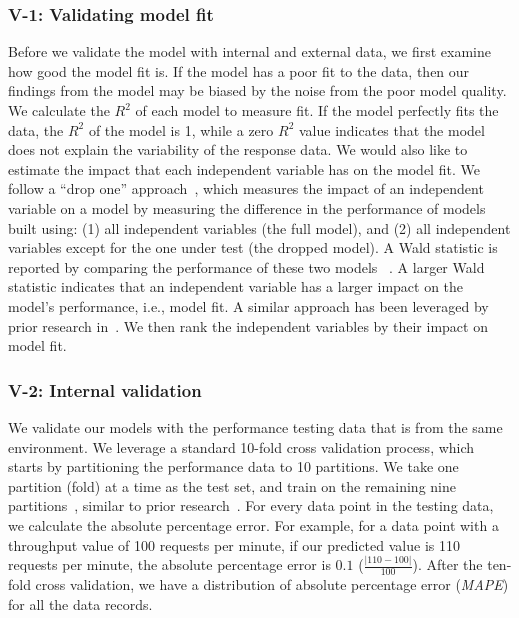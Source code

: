\documentclass[smallextended]{svjour3}       %
\begin{document}
\subsubsection{V-1: Validating model fit}

Before we validate the model with internal and external data, we first examine how good the model fit is. If the model has a poor fit to the data, then our findings from the model may be biased by the noise from the poor model quality. We calculate the $R^2$ of each model to measure fit. If the model perfectly fits the data, the $R^2$ of the model is 1, while a zero $R^2$ value indicates that the model does not explain the variability of the response data. We would also like to estimate the impact that each independent variable has on the model fit. We follow a ``drop one'' approach~\cite{Chambers1990}, which measures the impact of an independent variable on a model by measuring the difference in the performance of models built using: (1) all independent variables (the full model), and (2) all independent variables except for the one under test (the dropped model). A Wald statistic is reported by comparing the performance of these two models ~\cite{harrell2001regression}. A larger Wald statistic indicates that an independent variable has a larger impact on the model's performance, i.e., model fit. A similar approach has been leveraged by prior research in~\cite{mcintosh2015emse}. We then rank the independent variables by their impact on model fit. 


\subsubsection{V-2: Internal validation}

We validate our models with the performance testing data that is from the same environment. We leverage a standard 10-fold cross validation process, which starts by partitioning the performance data to 10 partitions. We take one partition (fold) at a time as the test set, and train on the remaining nine partitions~\cite{10foldcross,kohavi1995study}, similar to prior research~\cite{haroon}. For every data point in the testing data, we calculate the absolute percentage error. For example, for a data point with a throughput value of 100 requests per minute, if our predicted value is 110 requests per minute, the absolute percentage error is $0.1$ ($\frac{|110-100|}{100}$). After the ten-fold cross validation, we have a distribution of absolute percentage error (\textit{MAPE}) for all the data records.
\end{document}

